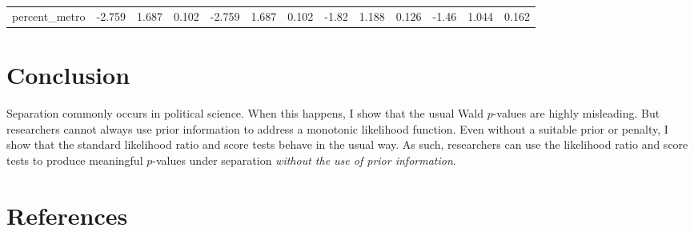 \documentclass[
]{article}
\begin{document}
\begin{table}[htbp]
\begin{tabular}{lrrrrrrrrrrrr}
    \textcolor[rgb]{ .2,  .2,  .2}{percent\_metro} & \textcolor[rgb]{ .2,  .2,  .2}{-2.759} & \textcolor[rgb]{ .2,  .2,  .2}{1.687} & \textcolor[rgb]{ .2,  .2,  .2}{0.102} & \textcolor[rgb]{ .2,  .2,  .2}{-2.759} & \textcolor[rgb]{ .2,  .2,  .2}{1.687} & \textcolor[rgb]{ .2,  .2,  .2}{0.102} & \textcolor[rgb]{ .2,  .2,  .2}{-1.82} & \textcolor[rgb]{ .2,  .2,  .2}{1.188} & \textcolor[rgb]{ .2,  .2,  .2}{0.126} & \textcolor[rgb]{ .2,  .2,  .2}{-1.46} & \textcolor[rgb]{ .2,  .2,  .2}{1.044} & \textcolor[rgb]{ .2,  .2,  .2}{0.162} \\
    \end{tabular}%
  \label{tab:addlabel}%
\end{table}%


\hypertarget{conclusion}{%
\section{Conclusion}\label{conclusion}}

Separation commonly occurs in political science. When this happens, I
show that the usual Wald \(p\)-values are highly misleading. But
researchers cannot always use prior information to address a monotonic
likelihood function. Even without a suitable prior or penalty, I show
that the standard likelihood ratio and score tests behave in the usual
way. As such, researchers can use the likelihood ratio and score tests
to produce meaningful \(p\)-values under separation \emph{without the
use of prior information}.

\newpage

\hypertarget{references}{%
\section{References}\label{references}}

\setlength{\parindent}{-0.2in}
\setlength{\leftskip}{0.2in}
\setlength{\parskip}{8pt}

\noindent
\end{document}
